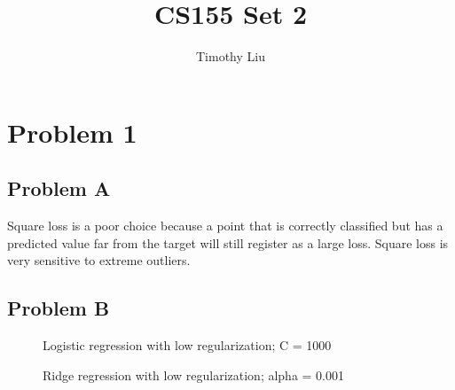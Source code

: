 \documentclass[12pt]{article} %
\title{CS155 Set 2}
\author{Timothy Liu}
\begin{document}
\maketitle

\newpage

\section{Problem 1}
\subsection{Problem A}
Square loss is a poor choice because a point that is correctly classified but has a predicted value far from the target will still register as a large loss. Square loss is very sensitive to extreme outliers.

\subsection{Problem B}

\begin{figure}[H]
	\vspace{-10mm}
	\caption{Logistic regression with low regularization; C = 1000}
\end{figure}


\begin{figure}[H]
	\vspace{-10mm}
	\caption{Ridge regression with low regularization; alpha = 0.001}
\end{figure}
\end{document}

